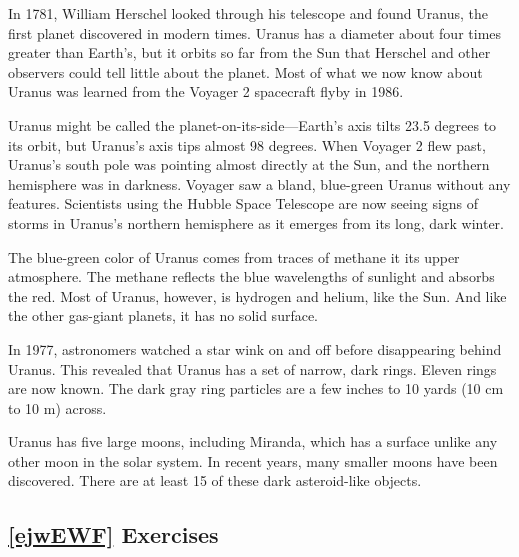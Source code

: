 \documentclass{article}
\numberwithin{equation}{section}
\numberwithin{figure}{section}
\begin{document}
\begin{displayquote}
    In 1781, William Herschel looked through his telescope and found Uranus, the first planet discovered in modern times. Uranus has a diameter about four times greater than Earth's, but it orbits so far from the Sun that Herschel and other observers could tell little about the planet. Most of what we now know about Uranus was learned from the Voyager 2 spacecraft flyby in 1986. 

    \vspace{1em}

    Uranus might be called the planet-on-its-side---Earth's axis tilts 23.5 degrees to its orbit, but Uranus's axis tips almost 98 degrees. When Voyager 2 flew past, Uranus's south pole was pointing almost directly at the Sun, and the northern hemisphere was in darkness. Voyager saw a bland, blue-green Uranus without any features. Scientists using the Hubble Space Telescope are now seeing signs of storms in Uranus's northern hemisphere as it emerges from its long, dark winter.

    \vspace{1em}

    The blue-green color of Uranus comes from traces of methane it its upper atmosphere. The methane reflects the blue wavelengths of sunlight and absorbs the red. Most of Uranus, however, is hydrogen and helium, like the Sun. And like the other gas-giant planets, it has no solid surface.

    \vspace{1em}

    In 1977, astronomers watched a star wink on and off before disappearing behind Uranus. This revealed that Uranus has a set of narrow, dark rings. Eleven rings are now known. The dark gray ring particles are a few inches to 10 yards (10 cm to 10 m) across. 

    \vspace{1em}

    Uranus has five large moons, including Miranda, which has a surface unlike any other moon in the solar system. In recent years, many smaller moons have been discovered. There are at least 15 of these dark asteroid-like objects. 
\end{displayquote}


\subsection*{\ref{ejwEWF} Exercises}
\end{document}
